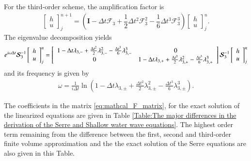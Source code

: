 \documentclass[preprint,sort&compress,1p]{article}
\begin{document}
For the third-order scheme, the amplification factor is
\begin{align}
\left[\begin{array}{c}
h \\ u
\end{array}\right]^{n+1}_j = \left(\boldsymbol{I}  -  \Delta t\boldsymbol{\mathcal{F}}_3   + \dfrac{1}{2}\Delta t^2\boldsymbol{\mathcal{F}}_3^2 - \dfrac{1}{6}\Delta t^3\boldsymbol{\mathcal{F}}_3^3 \right) \left[
\begin{array}{c}
h \\ u
\end{array}
\right]^n_j.
\end{align}
The eigenvalue decomposition yields
\begin{align}
e^{i\omega \Delta t}\boldsymbol{\mathcal{S}}_3^{-1}\left[\begin{array}{c}
h \\ u
\end{array}\right]^n_j =
 \left[\begin{array}{c c}
1 - \Delta t \lambda_{3,-} + \frac{\Delta t^2}{2} \lambda_{3,-}^2 - \frac{\Delta t^3}{6} \lambda_{3,-}^3  & 0 \\0  & 1 - \Delta t \lambda_{3,+} + \frac{\Delta t^2}{2} \lambda_{3,+}^2 - \frac{\Delta t^3}{6} \lambda_{3,+}^3
\end{array}\right] \boldsymbol{\mathcal{S}}_3^{-1}\left[\begin{array}{c}
h \\ u
\end{array}\right]^n_j
\end{align}
and its frequency is given by
\begin{align}
\label{eq:omega_third-order}
\omega = \frac{1}{i \Delta t} \ln \left(1 - \Delta t \lambda_{3,\pm} + \frac{\Delta t^2}{2} \lambda_{3,\pm}^2 - \frac{\Delta t^3}{6} \lambda_{3,\pm}^3\right).
\end{align}

The coefficients in the matrix \eqref{eq:mathcal_F_matrix}, for the exact solution of the linearized equations are given in Table \ref{Table:The major differences in the derivation of the Serre and Shallow water wave equations}. The highest order term remaining from the difference between the first, second and third-order finite volume approximation and the the exact solution of the Serre equations are also given in this Table.
\end{document}
